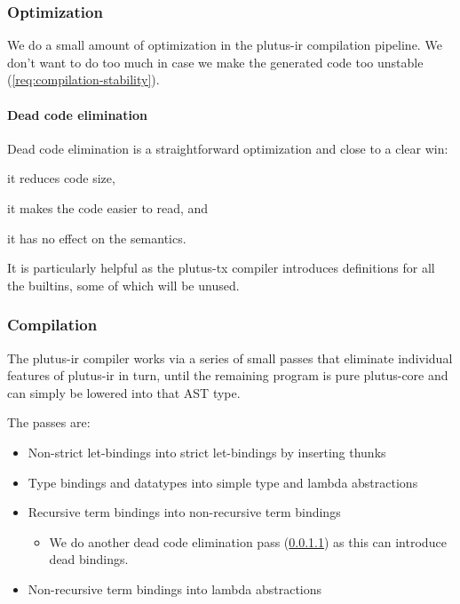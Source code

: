 \subsubsection{Optimization}

We do a small amount of optimization in the \gls{plutus-ir} compilation pipeline.
We don't want to do too much in case we make the generated code too unstable (\cref{req:compilation-stability}).

\paragraph{Dead code elimination}
\label{para:dead-code}

Dead code elimination is a straightforward optimization and close to a clear win:
\begin{inparaenum}
\item it reduces code size,
\item it makes the code easier to read, and
\item it has no effect on the semantics.
\end{inparaenum}

It is particularly helpful as the \gls{plutus-tx} compiler introduces definitions for all the builtins, some of which will be unused.

\subsubsection{Compilation}

The \gls{plutus-ir} compiler works via a series of small passes that eliminate individual features of \gls{plutus-ir} in turn, until the remaining program is pure \gls{plutus-core} and can simply be lowered into that AST type.

The passes are:
\begin{itemize}
\item Non-strict let-bindings into strict let-bindings by inserting thunks
\item Type bindings and datatypes into simple type and lambda abstractions
\item Recursive term bindings into non-recursive term bindings
  \begin{itemize}
  \item We do another dead code elimination pass (\cref{para:dead-code}) as this can introduce dead bindings.
  \end{itemize}
\item Non-recursive term bindings into lambda abstractions
\end{itemize}

